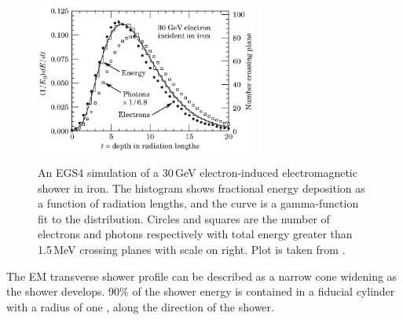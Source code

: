 
\begin{figure}[tbph]
\centering
{\includegraphics[width=0.65\textwidth]{photon/EMlong}}
\caption[Simulated longitudinal electromagnetic shower profile as a function of depth for electrons and photons.]
{An EGS4 simulation of a 30\,GeV electron-induced electromagnetic shower in iron. The histogram shows fractional energy deposition as a function of radiation lengths, and the curve is a gamma-function fit to the distribution. Circles and squares are the number of electrons and photons respectively with total energy greater than 1.5\,MeV crossing planes with scale on right. Plot is taken from \cite{Agashe:2014kda}.}
\label{fig:photonEMlongProfile}
\end{figure}

The EM transverse shower profile can be described as  a narrow cone widening as the shower develops. 90\% of the shower energy  is contained in a fiducial cylinder with a radius of one \RM, along the direction of the shower.







